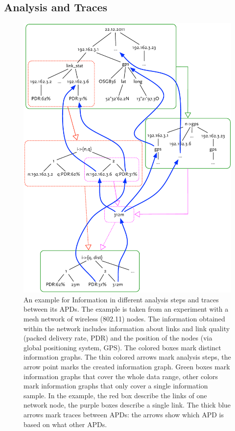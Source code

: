 \subsection{Analysis and Traces}
 
\begin{figure}
  \centering
  \includegraphics[width=\linewidth]{figures/example_analysis_data}
  \caption{An example for Information in different analysis steps and traces between its APDs. The example is taken from an experiment with a mesh network of wireless (802.11) nodes. The information obtained within the network includes information about links and link quality (packed delivery rate, PDR) and the position of the nodes (via global positioning system, GPS). The colored boxes mark distinct information graphs. The thin colored arrows mark analysis steps, the arrow point marks the created information graph. Green boxes mark information graphs that cover the whole data range, other colors mark information graphs that only cover a single information sample. In the example, the red box describe the links of one network node, the purple boxes describe a single link. The thick blue arrows mark traces between APDs: the arrows show which APD is based on what other APDs.}
  \label{fig:example_analysis_data}
\end{figure}

